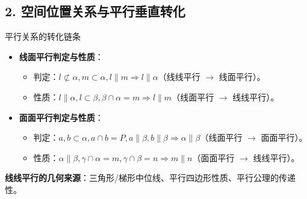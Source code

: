 \documentclass[11pt,a4paper]{ctexart}
\begin{document}

\subsection*{2. 空间位置关系与平行垂直转化}

\begin{teachbox}{平行关系的转化链条}
\begin{itemize}
  \item \textbf{线面平行判定与性质}：
    \begin{itemize}
      \item 判定：$l \not\subset \alpha, m \subset \alpha, l \parallel m \Rightarrow l \parallel \alpha$（线线平行 $\rightarrow$ 线面平行）。
      \item 性质：$l \parallel \alpha, l \subset \beta, \beta \cap \alpha = m \Rightarrow l \parallel m$（线面平行 $\rightarrow$ 线线平行）。
    \end{itemize}
  \item \textbf{面面平行判定与性质}：
    \begin{itemize}
      \item 判定：$a, b \subset \alpha, a \cap b = P, a \parallel \beta, b \parallel \beta \Rightarrow \alpha \parallel \beta$（线面平行 $\rightarrow$ 面面平行）。
      \item 性质：$\alpha \parallel \beta, \gamma \cap \alpha = m, \gamma \cap \beta = n \Rightarrow m \parallel n$（面面平行 $\rightarrow$ 线线平行）。
    \end{itemize}
\end{itemize}
\textbf{线线平行的几何来源}：三角形/梯形中位线、平行四边形性质、平行公理的传递性。
\end{teachbox}
\end{document}
